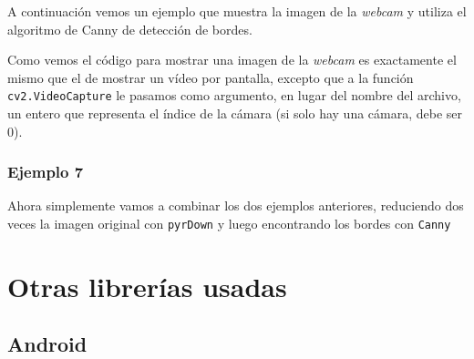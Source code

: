 \documentclass[a4paper,openright, 12pt]{book}
\begin{document}
A continuación vemos un ejemplo que muestra la imagen de la \textit{webcam} y utiliza el algoritmo de Canny de detección de bordes.

\newpage

Como vemos el código para mostrar una imagen de la \textit{webcam} es exactamente el mismo que el de mostrar un vídeo por pantalla, excepto que a la función \lstinline|cv2.VideoCapture| le pasamos como argumento, en lugar del nombre del archivo, un entero que representa el índice de la cámara (si solo hay una cámara, debe ser 0).
\newpage

\newpage 
\subsection*{Ejemplo 7}
Ahora simplemente vamos a combinar los dos ejemplos anteriores, reduciendo dos veces la imagen original con \lstinline|pyrDown| y luego encontrando los bordes con \lstinline|Canny|

\newpage

\chapter{Otras librerías usadas}
\section{Android}
\end{document}
